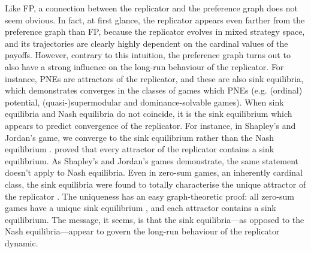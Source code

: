 \documentclass[preprint,authoryear]{elsarticle}
\begin{document}
Like FP, a connection between the replicator and the preference graph does not seem obvious. In fact, at first glance, the replicator appears even farther from the preference graph than FP, because the replicator evolves in mixed strategy space, and its trajectories are clearly highly dependent on the cardinal values of the payoffs. However, contrary to this intuition, the preference graph turns out to also have a strong influence on the long-run behaviour of the replicator. For instance, PNEs are attractors of the replicator, and these are also sink equilibria, which demonstrates converges in the classes of games which PNEs (e.g. (ordinal) potential, (quasi-)supermodular and dominance-solvable games). When sink equilibria and Nash equilibria do not coincide, it is the sink equilibrium which appears to predict convergence of the replicator. For instance, in Shapley's and Jordan's game, we converge to the sink equilibrium rather than the Nash equilibrium \citep{kleinberg_beyond_2011,viossat_no-regret_2013}. \cite{biggar_replicator_2023} proved that every attractor of the replicator contains a sink equilibrium. As Shapley's and Jordan's games demonstrate, the same statement doesn't apply to Nash equilibria. Even in zero-sum games, an inherently cardinal class, the sink equilibria were found to totally characterise the unique attractor of the replicator \citep{biggar_attractor_2024}. The uniqueness has an easy graph-theoretic proof: all zero-sum games have a unique sink equilibrium \citep{biggar_graph_2023}, and each attractor contains a sink equilibrium. The message, it seems, is that the sink equilibria---as opposed to the Nash equilibria---appear to govern the long-run behaviour of the replicator dynamic.





\end{document}

